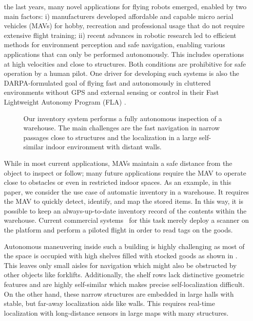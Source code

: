  the last years, many novel applications for flying robots emerged, enabled by two main factors: i) manufacturers  developed affordable and capable micro aerial vehicles (MAVs) for hobby, recreation and professional usage that do not require extensive flight training; ii) recent advances in robotic research led to efficient methods for environment perception and safe navigation, enabling various applications that can only be performed autonomously.
This includes operations at high velocities and close to structures. Both conditions are prohibitive for safe operation by a human pilot.
One driver for developing such systems is also the DARPA-formulated goal of flying fast and autonomously in cluttered environments without GPS and external sensing or control in their Fast Lightweight Autonomy Program (FLA) \cite{darpaFLA}.

\begin{figure}[t]
  \centering
  \vspace{-2.0em}
  \caption{Our inventory system performs a fully autonomous inspection of a warehouse. The main challenges are the fast navigation in narrow passages close to structures and the localization in a large self-similar indoor environment with distant walls.}
  \label{fig:inventur_screenshot}
  \vspace{-3ex}
\end{figure}

While in most current applications, MAVs maintain a safe distance from the object to inspect or follow; many future applications require the MAV to operate close to obstacles or even in restricted indoor spaces. As an example, in this paper, we consider the use case of automatic inventory in a warehouse.
It requires the MAV to quickly detect, identify, and map the stored items.
In this way, it is possible to keep an always-up-to-date inventory record of the contents within the warehouse. Current commercial systems~\cite{dronescan,eyesee} for this task merely deploy a scanner on the platform and perform a piloted flight in order to read tags on the goods.

Autonomous maneuvering inside such a building is highly challenging as most of the space is occupied with high shelves filled with stocked goods as shown in .
This leaves only small aisles for navigation which might also be obstructed by other objects like forklifts. Additionally, the shelf rows lack distinctive geometric features and are highly self-similar which makes precise self-localization difficult.
On the other hand, these narrow structures are embedded in large halls with stable, but far-away localization aids like walls.
This requires real-time localization with long-distance sensors in large maps with many structures.

